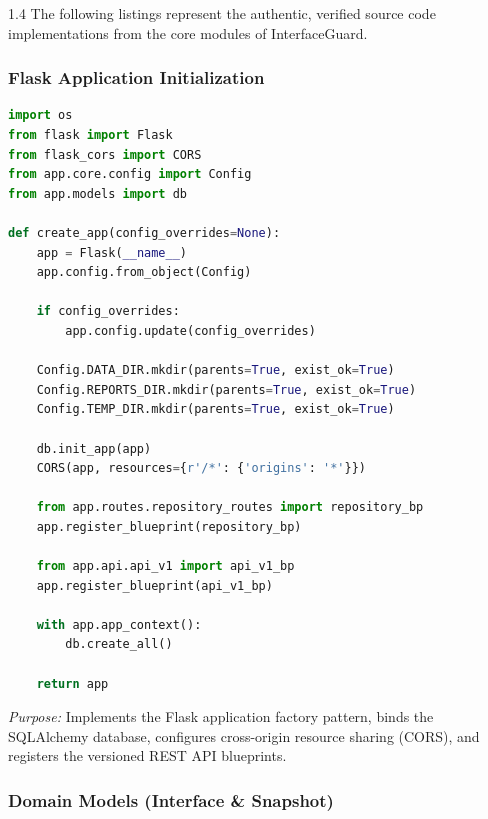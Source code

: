 \documentclass[12pt,a4paper]{article}
\begin{document}
\begin{spacing}{1.4}
\justifying
The following listings represent the authentic, verified source code implementations from the core modules of InterfaceGuard.
\end{spacing}

\subsubsection{Flask Application Initialization}

\begin{lstlisting}[language=Python]
import os
from flask import Flask
from flask_cors import CORS
from app.core.config import Config
from app.models import db

def create_app(config_overrides=None):
    app = Flask(__name__)
    app.config.from_object(Config)

    if config_overrides:
        app.config.update(config_overrides)

    Config.DATA_DIR.mkdir(parents=True, exist_ok=True)
    Config.REPORTS_DIR.mkdir(parents=True, exist_ok=True)
    Config.TEMP_DIR.mkdir(parents=True, exist_ok=True)

    db.init_app(app)
    CORS(app, resources={r'/*': {'origins': '*'}})

    from app.routes.repository_routes import repository_bp
    app.register_blueprint(repository_bp)

    from app.api.api_v1 import api_v1_bp
    app.register_blueprint(api_v1_bp)

    with app.app_context():
        db.create_all()

    return app
\end{lstlisting}

\noindent\textit{Purpose:} Implements the Flask application factory pattern, binds the SQLAlchemy database, configures cross-origin resource sharing (CORS), and registers the versioned REST API blueprints.

\subsubsection{Domain Models (Interface \& Snapshot)}
\end{document}
